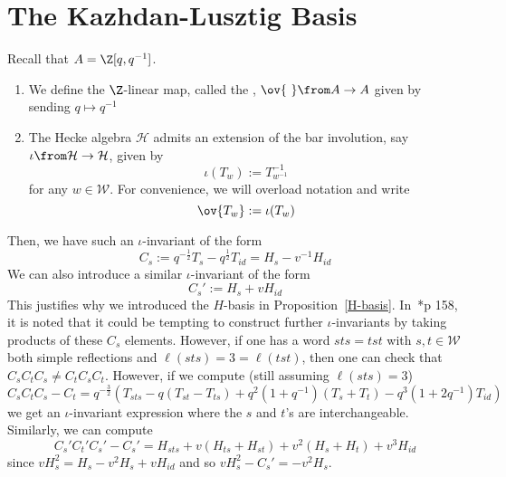 \documentclass[11pt,leqno,oneside]{amsart}
\numberwithin{thm}{section}
\renewcommand{\W}{\mathcal{W}}
\renewcommand{\H}{\mathcal{H}} %
\begin{document}
\section{The Kazhdan-Lusztig Basis}
\begin{defn}
  Recall that \(A = \Z[q,q^{-1}]\).
  \begin{enumerate}
  \item We define the \(\Z\)-linear map, called the , \(\ov{\ } \from A \to A\)
    given by sending \(q \mapsto q^{-1}\)
  \item   The Hecke algebra \(\H\) admits an extension of the bar
    involution, say \(\iota \from \H
  \to \H\), given by \[
    \iota(T_w) := T_{w^{-1}}^{-1}
  \]
  for any \(w \in \W\). For convenience, we will overload notation and
  write \[
    \ov{T_w} := \iota(T_w)
  \]
  \end{enumerate}
\end{defn}
 Then, we have such an \(\iota\)-invariant
 of the form \[
   C_s := q^{-\frac{1}{2}} T_s - q^{\frac{1}{2}} T_{id} = H_s-v^{-1} H_{id}
 \]
 We can also introduce a similar \(\iota\)-invariant of the form \[
   C_s' := H_s+v H_{id}
 \]
 This justifies why we introduced the \(H\)-basis in
 Proposition~\ref{H-basis}. 
 In~\cite{humphreys}*{p 158}, it is noted that it could be tempting to
 construct further \(\iota\)-invariants by taking products of these
 \(C_s\) elements. However, if one has a word \(sts = tst\) with \(s,t
 \in \W\) both simple reflections and \(\ell(sts) = 3 = \ell(tst)\),
 then one can check that \(C_s C_t C_s \neq C_t C_s C_t\). However, if
 we compute (still assuming \(\ell(sts) = 3\)) \[
   C_s C_t C_s - C_t = q^{-\frac{3}{2}}(T_{sts}-q(T_{st}-T_{ts})+q^2(1+q^{-1})(T_s+T_t)-q^3(1+2q^{-1})T_{id})
 \]
 we get an \(\iota\)-invariant expression where the \(s\) and \(t\)'s
 are interchangeable. Similarly, we can compute \[
   C_s' C_t' C_s' - C_s' = H_{sts} + v(H_{ts}+H_{st})+v^2(H_s+H_t) + v^3
   H_{id}
 \]
 since \(vH_s^2 = H_s-v^2H_s+vH_{id}\) and so \(vH_s^2 - C_s' = -v^2 H_s\).
 
\end{document}
